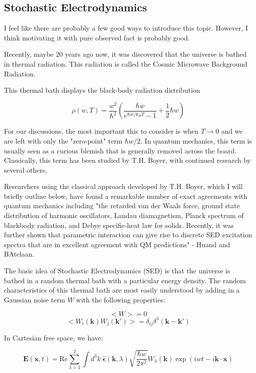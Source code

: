 \documentclass {article}
\renewcommand\vec{\mathbf}
\let\OldHat\hat
\renewcommand{\hat}[1]{\OldHat{\mathbf{#1}}}
\begin{document}
\subsection{Stochastic Electrodynamics}
I feel like there are probably a few good ways to introduce this topic. However, I think motivating it with pure observed fact is probably good.

Recently, maybe 20 years ago now, it was discovered that the universe is bathed in thermal radiation. This radiation is called the Cosmic Microwave Background Radiation. 

This thermal bath displays the black-body radiation distribution

$$\rho(w, T) = \frac {w^2} {\hbar^2} \left( \frac{ \hbar w}{e^{\hbar w / k_B T} - 1} + \frac 1 2 \hbar w    \right)$$

For our discussions, the most important this to consider is when $T \rightarrow 0$ and we are left with only the "zero-point" term $\hbar w / 2$. In quantum mechanics, this term is usually seen as a curious blemish that is generally removed across the board. Classically, this term has been studied by T.H. Boyer, with continued research by several others.

Researchers using the classical approach developed by T.H. Boyer, which I will briefly outline below, have found a remarkable number of exact agreements with quantum mechanics including "the retarded van der Waals force, ground state distribution of harmonic oscillators, Landau diamagnetism, Planck spectrum of blackbody radiation, and Debye specific-heat law for solids. Recently, it was further shown that parametric interaction can give rise to discrete SED excitation spectra that are in excellent agreement with QM predictions" - Huand and BAtelaan. 

The basic idea of Stochastic Electrodynamics (SED) is that the universe is bathed in a random thermal bath with a particular energy density. The random characteristics of this thermal bath are most easily understood by adding in a Gaussian noise term $W$ with the following properties:

$$<W> = 0$$
$$<W_i (\vec k) W_j (\vec k') > = \delta_{ij} \delta^3(\vec k - \vec k')$$

In Cartesian free space, we have:

$$\vec E (\vec x ,  t) = \text {Re} \sum_{\lambda = 1}^2  \int d^3k ~ \hat \epsilon(\vec k, \lambda) \sqrt {\frac {\hbar w} {2 \pi^2}} W_{\lambda}(\vec k) \exp(iwt - i\vec k \cdot \vec x)$$
\end{document}

